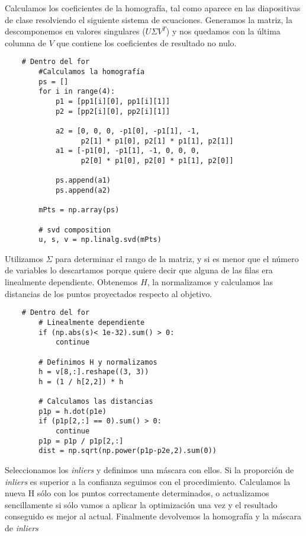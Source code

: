 \documentclass{article}
\newcommand{\img}[2]{
\noindent\makebox[\textwidth][c]{\texttt{[image: \#1]}}%
}
\begin{document}
Calculamos los coeficientes de la homografía, tal como aparece en las diapositivas de clase resolviendo el siguiente sistema de ecuaciones. Generamos la matriz, la descomponemos en valores singulares ($U\Sigma V^T$) y nos quedamos con la última columna de $V$ que contiene los coeficientes de resultado no nulo.

\img{img/b3_1}{0.6}

\begin{lstlisting}
    # Dentro del for
        #Calculamos la homografía
        ps = []
        for i in range(4):
            p1 = [pp1[i][0], pp1[i][1]]
            p2 = [pp2[i][0], pp2[i][1]]

            a2 = [0, 0, 0, -p1[0], -p1[1], -1,
                  p2[1] * p1[0], p2[1] * p1[1], p2[1]]
            a1 = [-p1[0], -p1[1], -1, 0, 0, 0,
                  p2[0] * p1[0], p2[0] * p1[1], p2[0]]

            ps.append(a1)
            ps.append(a2)

        mPts = np.array(ps)

        # svd composition
        u, s, v = np.linalg.svd(mPts)
\end{lstlisting}

Utilizamos $\Sigma$ para determinar el rango de la matriz, y si es menor que el número de variables lo descartamos porque quiere decir que alguna de las filas era linealmente dependiente. Obtenemos $H$, la normalizamos y calculamos las distancias de los puntos proyectados respecto al objetivo.

\begin{lstlisting}
	# Dentro del for
        # Linealmente dependiente
        if (np.abs(s)< 1e-32).sum() > 0:
            continue

        # Definimos H y normalizamos
        h = v[8,:].reshape((3, 3))
        h = (1 / h[2,2]) * h

        # Calculamos las distancias
        p1p = h.dot(p1e)
        if (p1p[2,:] == 0).sum() > 0:
            continue
        p1p = p1p / p1p[2,:]
        dist = np.sqrt(np.power(p1p-p2e,2).sum(0))
\end{lstlisting}        

Seleccionamos los \textit{inliers} y definimos una máscara con ellos. Si la proporción de \textit{inliers} es superior a la confianza seguimos con el procedimiento. Calculamos la nueva H sólo con los puntos correctamente determinados, o actualizamos sencillamente si sólo vamos a aplicar la optimización una vez y el resultado conseguido es mejor al actual. Finalmente devolvemos la homografía y la máscara de \textit{inliers}
\end{document}
